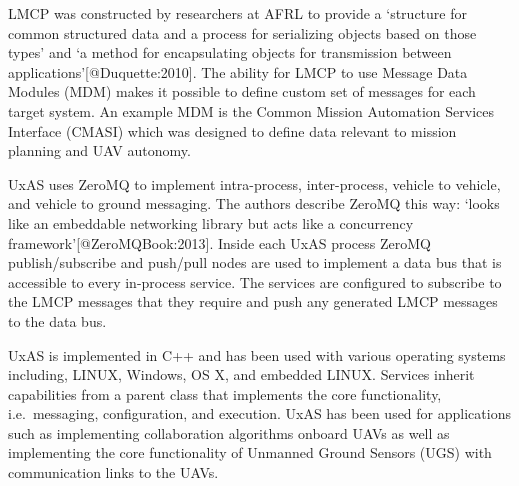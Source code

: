 LMCP was constructed by researchers at AFRL to provide a `structure for
common structured data and a process for serializing objects based on
those types' and `a method for encapsulating objects for transmission
between applications'{[}@Duquette:2010{]}. The ability for LMCP to use
Message Data Modules (MDM) makes it possible to define custom set of
messages for each target system. An example MDM is the Common Mission
Automation Services Interface (CMASI) which was designed to define data
relevant to mission planning and UAV autonomy.

UxAS uses ZeroMQ to implement intra-process, inter-process, vehicle to
vehicle, and vehicle to ground messaging. The authors describe ZeroMQ
this way: `looks like an embeddable networking library but acts like a
concurrency framework'{[}@ZeroMQBook:2013{]}. Inside each UxAS process
ZeroMQ publish/subscribe and push/pull nodes are used to implement a
data bus that is accessible to every in-process service. The services
are configured to subscribe to the LMCP messages that they require and
push any generated LMCP messages to the data bus.

UxAS is implemented in C++ and has been used with various operating
systems including, LINUX, Windows, OS X, and embedded LINUX. Services
inherit capabilities from a parent class that implements the core
functionality, i.e.~messaging, configuration, and execution. UxAS has
been used for applications such as implementing collaboration algorithms
onboard UAVs as well as implementing the core functionality of Unmanned
Ground Sensors (UGS) with communication links to the UAVs.
